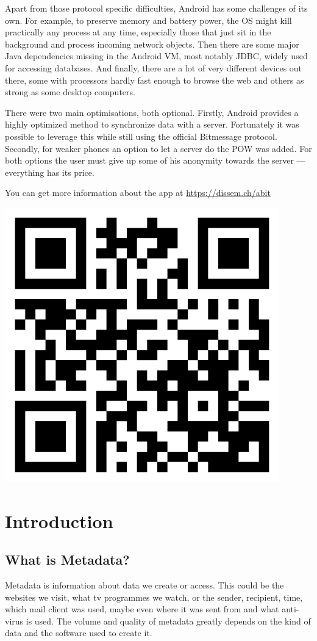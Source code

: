 \documentclass{bfh}
\begin{document}
  Apart from those protocol specific difficulties, Android\texttrademark{} has some challenges of its own. For example, to preserve memory and battery power, the \acl{OS} might kill practically any process at any time, especially those that just sit in the background and process incoming network objects. Then there are some major Java dependencies missing in the Android VM, most notably \acs{JDBC}, widely used for accessing databases. And finally, there are a lot of very different devices out there, some with processors hardly fast enough to browse the web and others as strong as some desktop computers.

  There were two main optimisations, both optional. Firstly, Android provides a highly optimized method to synchronize data with a server. Fortunately it was possible to leverage this while still using the official Bitmessage protocol. Secondly, for weaker phones an option to let a server do the \acl{POW} was added. For both options the user must give up some of his anonymity towards the server --- everything has its price.

  You can get more information about the app at \url{https://dissem.ch/abit}

  \begin{center}
    \includegraphics[width=0.3 \textwidth]{images/QR_abit_webpage.pdf}
  \end{center}


  \newpage
  \tableofcontents


  \newpage
  \section{Introduction}

  \subsection{What is Metadata?}

  Metadata is information about data we create or access. This could be the websites we visit, what tv programmes we watch, or the sender, recipient, time, which mail client was used, maybe even where it was sent from and what anti-virus is used. The volume and quality of metadata greatly depends on the kind of data and the software used to create it.
\end{document}
